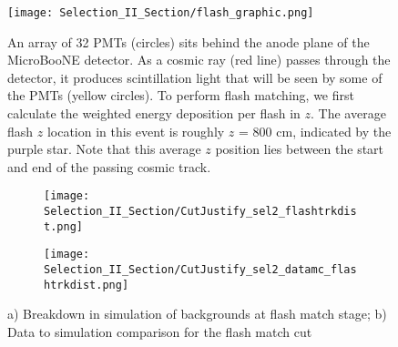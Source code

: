 \begin{figure}[H]
\centering
    \centering
\texttt{[image: Selection\_II\_Section/flash\_graphic.png]}
\caption{ An array of 32 PMTs (circles) sits behind the anode plane of the MicroBooNE detector. As a cosmic ray (red line) passes through the detector, it produces scintillation light that will be seen by some of the PMTs (yellow circles). To perform flash matching, we first calculate the weighted energy deposition per flash in $z$.  The average flash $z$ location in this event is roughly $z$ = 800 cm, indicated by the purple star. Note that this average $z$ position lies between the start and end of the passing cosmic track. } 
\label{fig:flash_graphic}
\end{figure}



\begin{figure}[H]
  \begin{subfigure}[t]{0.4\textwidth}
\texttt{[image: Selection\_II\_Section/CutJustify\_sel2\_flashtrkdist.png]}
    \caption{ }
  \end{subfigure} 
  \hspace{10 mm}
  \begin{subfigure}[t]{0.4\textwidth}
\texttt{[image: Selection\_II\_Section/CutJustify\_sel2\_datamc\_flashtrkdist.png]}
    \caption{ }
  \end{subfigure} 
\caption{ a) Breakdown in simulation of backgrounds at flash match stage; b) Data to simulation comparison for the flash match cut }
\label{fig:cutjust_sel2_flashtrkdist}
\end{figure}


